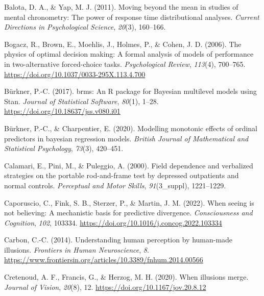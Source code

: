 \documentclass[
  man,floatsintext]{apa6}
\newlength{\cslhangindent}
\newlength{\cslentryspacingunit} %
\newenvironment{CSLReferences}[2] %
 {%
  \setlength{\parindent}{0pt}
  \ifodd #1
  \let\oldpar\par
  \def\par{\hangindent=\cslhangindent\oldpar}
  \fi
  \setlength{\parskip}{#2\cslentryspacingunit}
 }%
 {}
\begin{document}
\hypertarget{refs}{}
\begin{CSLReferences}{1}{0}
\leavevmode{}%
Balota, D. A., \& Yap, M. J. (2011). Moving beyond the mean in studies of mental chronometry: The power of response time distributional analyses. \emph{Current Directions in Psychological Science}, \emph{20}(3), 160--166.

\leavevmode{}%
Bogacz, R., Brown, E., Moehlis, J., Holmes, P., \& Cohen, J. D. (2006). The physics of optimal decision making: A formal analysis of models of performance in two-alternative forced-choice tasks. \emph{Psychological Review}, \emph{113}(4), 700--765. \url{https://doi.org/10.1037/0033-295X.113.4.700}

\leavevmode{}%
Bürkner, P.-C. (2017). {brms}: An {R} package for {Bayesian} multilevel models using {Stan}. \emph{Journal of Statistical Software}, \emph{80}(1), 1--28. \url{https://doi.org/10.18637/jss.v080.i01}

\leavevmode{}%
Bürkner, P.-C., \& Charpentier, E. (2020). Modelling monotonic effects of ordinal predictors in bayesian regression models. \emph{British Journal of Mathematical and Statistical Psychology}, \emph{73}(3), 420--451.

\leavevmode{}%
Calamari, E., Pini, M., \& Puleggio, A. (2000). Field dependence and verbalized strategies on the portable rod-and-frame test by depressed outpatients and normal controls. \emph{Perceptual and Motor Skills}, \emph{91}(3\_suppl), 1221--1229.

\leavevmode{}%
Caporuscio, C., Fink, S. B., Sterzer, P., \& Martin, J. M. (2022). When seeing is not believing: A mechanistic basis for predictive divergence. \emph{Consciousness and Cognition}, \emph{102}, 103334. \url{https://doi.org/10.1016/j.concog.2022.103334}

\leavevmode{}%
Carbon, C.-C. (2014). Understanding human perception by human-made illusions. \emph{Frontiers in Human Neuroscience}, \emph{8}. \url{https://www.frontiersin.org/articles/10.3389/fnhum.2014.00566}

\leavevmode{}%
Cretenoud, A. F., Francis, G., \& Herzog, M. H. (2020). When illusions merge. \emph{Journal of Vision}, \emph{20}(8), 12. \url{https://doi.org/10.1167/jov.20.8.12}


\end{CSLReferences}
\end{document}
